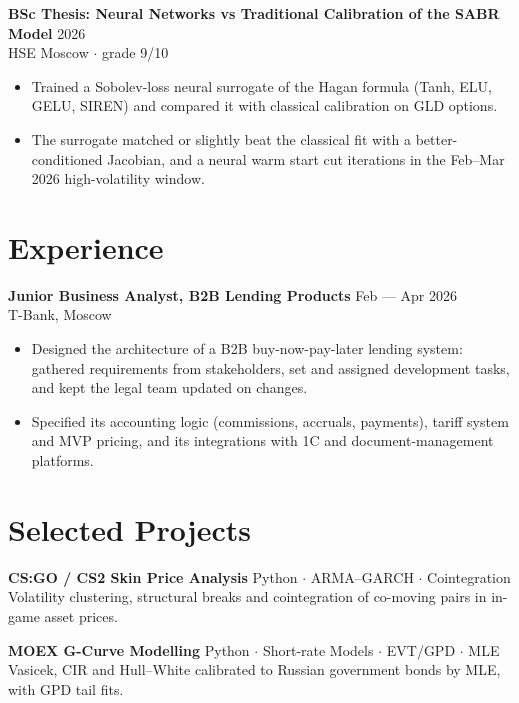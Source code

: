 \documentclass[11pt,a4paper]{article}
\newcommand{\role}[3]{%
  \textbf{#1} \hfill \textcolor{muted}{\small #3}\\%
  \textcolor{muted}{\small #2}%
}
\begin{document}
\vspace{2pt}

\textbf{BSc Thesis: Neural Networks vs Traditional Calibration of the SABR Model} \hfill \textcolor{muted}{\small 2026}\\
\textcolor{muted}{\small HSE Moscow $\cdot$ grade 9/10}
\begin{itemize}
  \item Trained a Sobolev-loss neural surrogate of the Hagan formula (Tanh, ELU, GELU, SIREN) and compared it with classical calibration on GLD options.
  \item The surrogate matched or slightly beat the classical fit with a better-conditioned Jacobian, and a neural warm start cut iterations in the Feb--Mar 2026 high-volatility window.
\end{itemize}

\section{Experience}

\role{Junior Business Analyst, B2B Lending Products}{T-Bank, Moscow}{Feb --- Apr 2026}
\begin{itemize}
  \item Designed the architecture of a B2B buy-now-pay-later lending system: gathered requirements from stakeholders, set and assigned development tasks, and kept the legal team updated on changes.
  \item Specified its accounting logic (commissions, accruals, payments), tariff system and MVP pricing, and its integrations with 1C and document-management platforms.
\end{itemize}

\section{Selected Projects}

\textbf{CS:GO / CS2 Skin Price Analysis} \hfill \textcolor{muted}{\small Python $\cdot$ ARMA--GARCH $\cdot$ Cointegration}\\
Volatility clustering, structural breaks and cointegration of co-moving pairs in in-game asset prices.

\vspace{4pt}

\textbf{MOEX G-Curve Modelling} \hfill \textcolor{muted}{\small Python $\cdot$ Short-rate Models $\cdot$ EVT/GPD $\cdot$ MLE}\\
Vasicek, CIR and Hull--White calibrated to Russian government bonds by MLE, with GPD tail fits.
\end{document}
